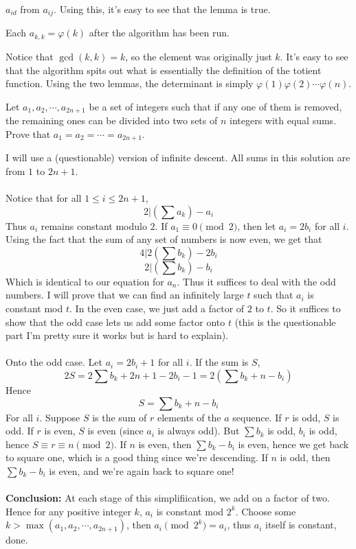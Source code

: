 \documentclass[11pt]{scrartcl}
\begin{document}
  $a_{id}$ from $a_{ij}$. Using this, it's easy to see that the lemma is true.
 \begin{lemma}
   Each $a_{k,k}=\varphi(k)$ after the algorithm has been run.
 \end{lemma}
  Notice that $\gcd(k,k)=k$, so the element was originally just $k$. It's easy to see that the algorithm spits out what is essentially
  the definition of the totient function.
 \newline \newline
  Using the two lemmas, the determinant is simply $\varphi(1)\varphi(2)\cdots\varphi(n)$.
  \newpage
  \begin{example}
    Let $a_1, a_2, \cdots, a_{2n+1}$ be a set of integers such that if any one
    of them is removed, the remaining ones can be divided into two sets of
    $n$ integers with equal sums. Prove that $a_1=a_2=\cdots=a_{2n+1}$.
  \end{example}
  \begin{soln}
    I will use a (questionable) version of infinite descent. All sums in this solution
    are from $1$ to $2n+1$.
    \\ \\
    Notice that for all $1\le i\le 2n+1$,
    $$2|\left(\sum a_k\right)-a_i$$
    Thus $a_i$ remains constant modulo $2$.
    If $a_1\equiv 0\pmod{2}$, then let $a_i=2b_i$ for all $i$.
    Using the fact that the sum of any set of numbers is now even, we get that
    $$4|2\left(\sum b_k\right)-2b_i$$
    $$2|\left(\sum b_k\right)-b_i$$
    Which is identical to our equation for $a_n$. Thus it suffices to deal with
    the odd numbers. I will prove that we can find an infinitely large $t$ such
    that $a_i$ is constant mod $t$. In the even case, we just add a factor of
    $2$ to $t$. So it suffices to show that the odd case lets us add some factor
    onto $t$ (this is the questionable part \-\- I'm pretty sure it works but is hard to explain).
    \\ \\
    Onto the odd case. Let $a_i=2b_i+1$ for all $i$. If the sum is $S$,
    $$2S=2\sum b_k+2n+1-2b_i-1=2\left(\sum b_k+n-b_i\right)$$
    Hence
    $$S=\sum b_k +n-b_i$$
    For all $i$. Suppose $S$ is the sum of $r$ elements of the $a$ sequence. If $r$ is odd, $S$ is odd. If $r$ is even, $S$ is even (since $a_i$ is always odd).
    But $\sum b_k$ is odd, $b_i$ is odd, hence $S\equiv r\equiv n\pmod{2}$. If $n$ is even, then $\sum b_k-b_i$ is even, hence we get back to square one,
    which is a good thing since we're descending. If $n$ is odd, then $\sum b_k -b_i$ is even, and we're again back to square one!
    \\ \\
    \textbf{Conclusion: } At each stage of this simplifiication, we add on a factor of two. Hence for any positive integer $k$,
    $a_i$ is constant mod $2^k$. Choose some $k>\max(a_1, a_2,\cdots, a_{2n+1})$, then $a_i\pmod{2^k}=a_i$, thus $a_i$ itself is constant, done.
  \end{soln}
\end{document}
